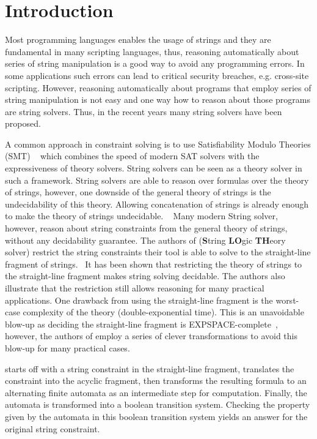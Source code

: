 
\section{Introduction}
\label{sec:intro}
Most programming languages enables the usage of strings and they are fundamental in many scripting languages, thus, reasoning automatically about series of string manipulation is a good way to avoid any programming errors.
In some applications such errors can lead to critical security breaches, e.g. cross-site scripting.
However, reasoning automatically about programs that employ series of string manipulation is not easy and one way how to reason about those programs are string solvers.
Thus, in the recent years many string solvers have been proposed. ~\cite{??}


A common approach in constraint solving is to use Satisfiability Modulo Theories (SMT) ~\cite{??} which combines the speed of modern SAT solvers with the expressiveness of theory solvers. 
String solvers can be seen as a theory solver in such a framework.
String solvers are able to reason over formulas over the theory of strings, however, one downside of the general theory of strings is the undecidability of this theory.
Allowing concatenation of strings is already enough to make the theory of strings undecidable. ~\cite{??}
Many modern String solver, however, reason about string constraints from the general theory of strings, without any decidability guarantee.
The authors of \sloth (\textbf{S}tring \textbf{LO}gic \textbf{TH}eory solver) restrict the string constraints their tool is able to solve to the straight-line fragment of strings.~\cite{??}
It has been shown that restricting the theory of strings to the straight-line fragment makes string solving decidable.
The authors also illustrate that the restriction still allows reasoning for many practical applications.
One drawback from using the straight-line fragment is the worst-case complexity
of the theory (double-exponential time). 
This is an unavoidable blow-up as deciding the straight-line fragment is EXPSPACE-complete~\cite{??}, however, the authors of \sloth employ a series of clever transformations to avoid this blow-up for many practical cases.

\sloth starts off with a string constraint in the straight-line fragment, translates the constraint into the acyclic fragment, then transforms the resulting formula to an alternating finite automata as an intermediate step for computation. Finally, the automata is transformed into a boolean transition system. Checking the property given by the automata in this boolean transition system yields an answer for the original string constraint.

